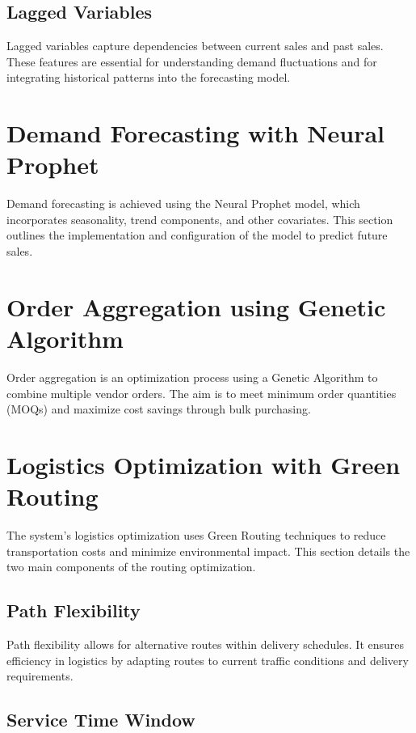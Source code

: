\subsection{Lagged Variables}

Lagged variables capture dependencies between current sales and past sales. These features are essential for understanding demand fluctuations and for integrating historical patterns into the forecasting model.

\section{Demand Forecasting with Neural Prophet}

Demand forecasting is achieved using the Neural Prophet model, which incorporates seasonality, trend components, and other covariates. This section outlines the implementation and configuration of the model to predict future sales.

\section{Order Aggregation using Genetic Algorithm}

Order aggregation is an optimization process using a Genetic Algorithm to combine multiple vendor orders. The aim is to meet minimum order quantities (MOQs) and maximize cost savings through bulk purchasing.

\section{Logistics Optimization with Green Routing}

The system’s logistics optimization uses Green Routing techniques to reduce transportation costs and minimize environmental impact. This section details the two main components of the routing optimization.

\subsection{Path Flexibility}

Path flexibility allows for alternative routes within delivery schedules. It ensures efficiency in logistics by adapting routes to current traffic conditions and delivery requirements.

\subsection{Service Time Window}

